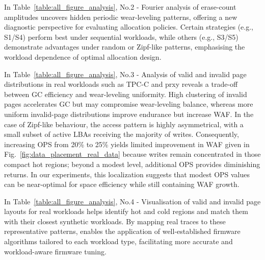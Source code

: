 \documentclass{ieeeaccess}
\begin{document}
In Table~\ref{table:all_figure_analysis}, No.2 - Fourier analysis of erase-count amplitudes uncovers hidden periodic wear-leveling patterns, offering a new diagnostic perspective for evaluating allocation policies. Certain strategies (e.g., S1/S4) perform best under sequential workloads, while others (e.g., S3/S5) demonstrate advantages under random or Zipf-like patterns, emphasising the workload dependence of optimal allocation design.

In Table~\ref{table:all_figure_analysis}, No.3 - Analysis of valid and invalid page distributions in real workloads such as TPC-C and prxy reveals a trade-off between GC efficiency and wear-leveling uniformity. High clustering of invalid pages accelerates GC but may compromise wear-leveling balance, whereas more uniform invalid-page distributions improve endurance but increase WAF. In the case of Zipf-like behaviour, the access pattern is highly asymmetrical, with a small subset of active LBAs receiving the majority of writes. Consequently, increasing OPS from 20\% to 25\% yields limited improvement in WAF given in Fig.~\ref{fig:data_placement_real_data} because writes remain concentrated in those compact hot regions; beyond a modest level, additional OPS provides diminishing returns. In our experiments, this localization suggests that modest OPS values can be near-optimal for space efficiency while still containing WAF growth.

In Table~\ref{table:all_figure_analysis}, No.4 - Visualisation of valid and invalid page layouts for real workloads helps identify hot and cold\cite{hot-cold} regions and match them with their closest synthetic workloads. By mapping real traces to these representative patterns, \eyanassdsim enables the application of well-established firmware algorithms tailored to each workload type, facilitating more accurate and workload-aware firmware tuning.
\end{document}
